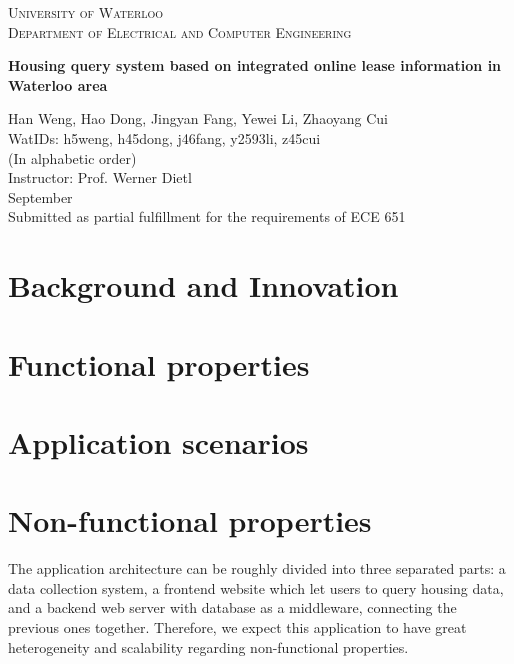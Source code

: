 \documentclass[10pt]{article}
\begin{document}
	\begin{titlepage}
		\begin{center}
			{\hphantom{M}}
			\vspace{1cm}
			{\scshape\Huge{University of Waterloo}}\\
			\vspace{2cm}
			{\scshape\Large Department of Electrical and Computer Engineering}\\
			\vspace{1.5cm}
			\begin{spacing}{2.5}
			{\LARGE\bfseries Housing query system based on integrated online lease information in Waterloo area }\\
			\end{spacing} 
			\vspace{2cm}
			{\Large{Han Weng, Hao Dong, Jingyan Fang, Yewei Li, Zhaoyang Cui\\ 
			WatIDs: h5weng, h45dong, j46fang, y2593li, z45cui \\ 
			(In alphabetic order) \\ 
			\vspace{4em}
			Instructor: Prof. Werner Dietl}}
			\vspace{3em}\\
			{\Large September\quad 2018}\\
			\vspace{2em}
			{\Large Submitted as partial fulfillment for the requirements of ECE 651}
		\end{center}
	\end{titlepage}

	\begin{spacing}{1.5}
	\large
	\tableofcontents
	\end{spacing}
	\newpage

	\section{Background and Innovation}

	\section{Functional properties}

	\section{Application scenarios}

	\section{Non-functional properties}
		The application architecture can be roughly divided into three separated parts: a data collection system, a frontend website which let users to query housing data, and a backend web server with database as a middleware, connecting the previous ones together. Therefore, we expect this application to have great heterogeneity and scalability regarding non-functional properties.
\end{document}
